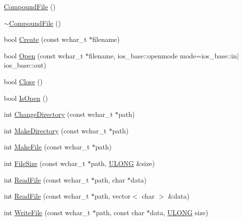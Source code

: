 \begin{DoxyCompactItemize}
\item 
\hyperlink{class_y_compound_files_1_1_compound_file_af4b6835e9949d08d62dab4414fb80c72}{Compound\+File} ()
\item 
\hyperlink{class_y_compound_files_1_1_compound_file_a828355b586c4936e4dbae3f3439d66aa}{$\sim$\+Compound\+File} ()
\item 
bool \hyperlink{class_y_compound_files_1_1_compound_file_a02dbf71e18675f6dcbe2e9a7b3bca189}{Create} (const wchar\+\_\+t $\ast$filename)
\item 
bool \hyperlink{class_y_compound_files_1_1_compound_file_a297267446c654c3361e89592d85c1563}{Open} (const wchar\+\_\+t $\ast$filename, ios\+\_\+base\+::openmode mode=ios\+\_\+base\+::in$\vert$ios\+\_\+base\+::out)
\item 
bool \hyperlink{class_y_compound_files_1_1_compound_file_ab483c310646b994a1948cd463c70ab50}{Close} ()
\item 
bool \hyperlink{class_y_compound_files_1_1_compound_file_aa9b06c1eb80ad96cb0fcde1a4746d474}{Is\+Open} ()
\item 
int \hyperlink{class_y_compound_files_1_1_compound_file_ac87beb0f14a5e4e4576b8b2f81009a5c}{Change\+Directory} (const wchar\+\_\+t $\ast$path)
\item 
int \hyperlink{class_y_compound_files_1_1_compound_file_af9055cd718f70d9c907c020144ce197d}{Make\+Directory} (const wchar\+\_\+t $\ast$path)
\item 
int \hyperlink{class_y_compound_files_1_1_compound_file_a59e8cdb9298793896c27fb13637eae93}{Make\+File} (const wchar\+\_\+t $\ast$path)
\item 
int \hyperlink{class_y_compound_files_1_1_compound_file_a61916e4b689eed64e37e3fa274d97734}{File\+Size} (const wchar\+\_\+t $\ast$path, \hyperlink{_basic_excel_8hpp_abe09d1bea023be6a07cbadde8e955435}{U\+L\+O\+N\+G} \&size)
\item 
int \hyperlink{class_y_compound_files_1_1_compound_file_a0b4e9f62504461a07d74ee10febfee2e}{Read\+File} (const wchar\+\_\+t $\ast$path, char $\ast$data)
\item 
int \hyperlink{class_y_compound_files_1_1_compound_file_a6b888bccad8d92a486e8f25b01a4b170}{Read\+File} (const wchar\+\_\+t $\ast$path, vector$<$ char $>$ \&data)
\item 
int \hyperlink{class_y_compound_files_1_1_compound_file_a554fb5c28f9c4d1d42f33f99583a4967}{Write\+File} (const wchar\+\_\+t $\ast$path, const char $\ast$data, \hyperlink{_basic_excel_8hpp_abe09d1bea023be6a07cbadde8e955435}{U\+L\+O\+N\+G} size)
\item 

\end{DoxyCompactItemize}
